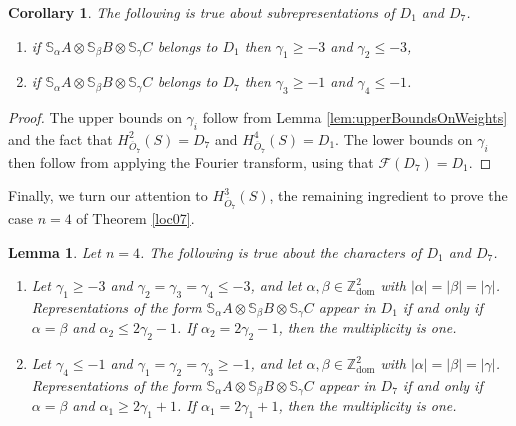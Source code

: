 \documentclass[11pt,reqno]{amsart}
\newcommand{\oo}{\otimes}
\newcommand{\bS}{\mathbb{S}}
\newcommand{\dom}{\operatorname{dom}}
\newcommand{\mc}[1]{\mathcal{#1}}
\newcommand{\ol}[1]{\overline{#1}}
\newtheorem{lemma}[theorem]{Lemma}
\newtheorem{corollary}[theorem]{Corollary}
\numberwithin{equation}{section}
\begin{document}
\begin{corollary}\label{cor:weightBoundsn4}
The following is true about subrepresentations of $D_1$ and $D_7$.	

\begin{enumerate}
\item if $\bS_{\alpha}A\oo \bS_{\beta}B\oo \bS_{\gamma}C$ belongs to $D_1$ then $\gamma_1\geq -3$ and $\gamma_2\leq -3$,
\item if $\bS_{\alpha}A\oo \bS_{\beta}B\oo \bS_{\gamma}C$ belongs to $D_7$ then $\gamma_3\geq -1$ and $\gamma_4\leq -1$.
\end{enumerate}


\end{corollary}

\begin{proof}
The upper bounds on $\gamma_i$ follow from Lemma \ref{lem:upperBoundsOnWeights} and the fact that $H^2_{\ol{O}_7}(S)=D_7$ and $H^4_{\ol{O}_7}(S)=D_1$. The lower bounds on $\gamma_i$ then follow from applying the Fourier transform, using that $\mc{F}(D_7)=D_1$.
\end{proof}

Finally, we turn our attention to $H^3_{\ol{O}_7}(S)$, the remaining ingredient to prove the case $n=4$ of Theorem \ref{loc07}.

\begin{lemma}\label{lem:wit17n4}
Let $n=4$. The following is true about the characters of $D_1$ and $D_7$.

\begin{enumerate}
\item Let $\gamma_1\geq -3$ and $\gamma_2=\gamma_3=\gamma_4\leq -3$, and let $\alpha,\beta \in \mathbb{Z}^2_{\dom}$ with $|\alpha|=|\beta|=|\gamma|$. Representations of the form $\bS_{\alpha}A\oo \bS_{\beta}B\oo \bS_{\gamma}C$ appear in $D_1$ if and only if  $\alpha=\beta$ and $\alpha_2\leq 2\gamma_2-1$. If $\alpha_2= 2\gamma_2-1$, then the multiplicity is one.	
\item Let $\gamma_4\leq -1$ and $\gamma_1=\gamma_2=\gamma_3\geq -1$, and let $\alpha,\beta \in \mathbb{Z}^2_{\dom}$ with $|\alpha|=|\beta|=|\gamma|$. Representations of the form $\bS_{\alpha}A\oo \bS_{\beta}B\oo \bS_{\gamma}C$ appear in $D_7$ if and only if  $\alpha=\beta$ and $\alpha_1\geq 2\gamma_1+1$. If $\alpha_1= 2\gamma_1+1$, then the multiplicity is one.	

\end{enumerate}
	
\end{lemma}
\end{document}
